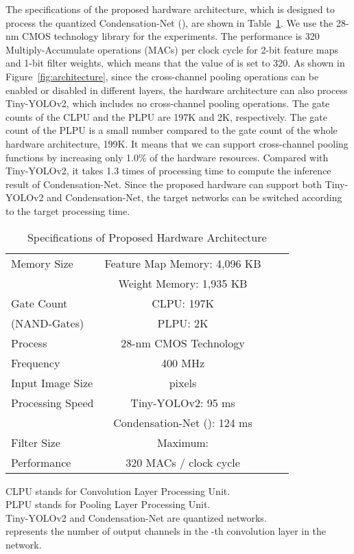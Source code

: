 \documentclass[10pt,twocolumn,letterpaper]{article}
\begin{document}
The specifications of the proposed hardware architecture, which is designed to process the quantized Condensation-Net (), are shown in Table~\ref{tab:spec}. We use the 28-nm CMOS technology library for the experiments. The performance is 320 Multiply-Accumulate operations (MACs) per clock cycle for 2-bit feature maps and 1-bit filter weights, which means that the value of  is set to 320. As shown in Figure~\ref{fig:architecture}, since the cross-channel pooling operations can be enabled or disabled in different layers, the hardware architecture can also process Tiny-YOLOv2, which includes no cross-channel pooling operations. The gate counts of the CLPU and the PLPU are 197K and 2K, respectively. The gate count of the PLPU is a small number compared to the gate count of the whole hardware architecture, 199K. It means that we can support cross-channel pooling functions by increasing only 1.0\% of the hardware resources. Compared with Tiny-YOLOv2, it takes 1.3 times of processing time to compute the inference result of Condensation-Net. Since the proposed hardware can support both Tiny-YOLOv2 and Condensation-Net, the target networks can be switched according to the target processing time.

\begin{table}
\begin{center}
\begin{tabular}{lccc}
\hline
  Memory Size & Feature Map Memory: 4,096 KB   \\
              & Weight Memory: 1,935 KB   \\
\hline
  Gate Count & CLPU: 197K \\
  (NAND-Gates) & PLPU: 2K\\  
\hline
  Process &  28-nm CMOS Technology\\
\hline
  Frequency &  400 MHz\\  
\hline
  Input Image Size &  pixels\\
\hline
  Processing Speed & Tiny-YOLOv2: 95 ms\\
                   & Condensation-Net (): 124 ms\\
\hline
  Filter Size & Maximum: \\
\hline
  Performance &   320 MACs / clock cycle\\
\hline
\end{tabular}
\end{center}
{\small
CLPU stands for Convolution Layer Processing Unit.\\
PLPU stands for Pooling Layer Processing Unit.\\
Tiny-YOLOv2 and Condensation-Net are quantized networks.\\
 represents the number of output channels in the -th convolution layer in the network.\\
}
\caption{Specifications of Proposed Hardware Architecture}
\label{tab:spec}
\end{table}
\end{document}
